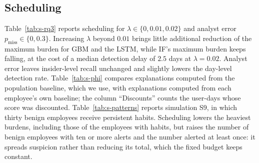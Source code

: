 \documentclass[10pt,onecolumn,letterpaper]{article}
\begin{document}
\subsection{Scheduling}
Table~\ref{tab:s-rq3} reports scheduling for $\lambda\in\{0,0.01,0.02\}$ and analyst error $p_{\mathrm{miss}}\in\{0,0.3\}$. Increasing $\lambda$ beyond $0.01$ brings little additional reduction of the maximum burden for GBM and the LSTM, while IF's maximum burden keeps falling, at the cost of a median detection delay of $2.5$ days at $\lambda=0.02$. Analyst error leaves insider-level recall unchanged and slightly lowers the day-level detection rate. Table~\ref{tab:s-phi} compares explanations computed from the population baseline, which we use, with explanations computed from each employee's own baseline; the column ``Discounts'' counts the user-days whose score was discounted. Table~\ref{tab:s-patterns} reports simulation S9, in which thirty benign employees receive persistent habits. Scheduling lowers the heaviest burdens, including those of the employees with habits, but raises the number of benign employees with ten or more alerts and the number alerted at least once: it spreads suspicion rather than reducing its total, which the fixed budget keeps constant.
\end{document}
